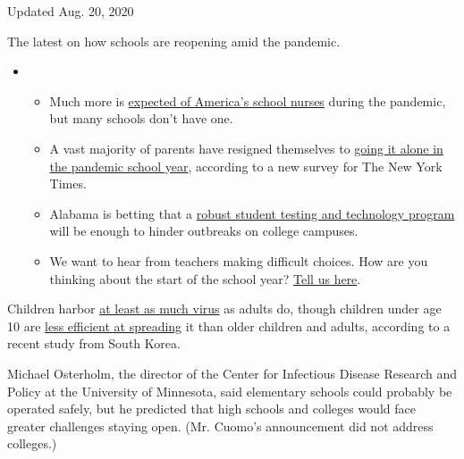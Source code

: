 Updated Aug. 20, 2020

The latest on how schools are reopening amid the pandemic.

\begin{itemize}
\item
  \begin{itemize}
  \tightlist
  \item
    Much more is
    \href{https://www.nytimes3xbfgragh.onion/2020/08/20/us/schools-reopening-nurses-covid.html?action=click\&pgtype=Article\&state=default\&region=MAIN_CONTENT_3\&context=storylines_keepup}{expected
    of America's school nurses} during the pandemic, but many schools
    don't have one.
  \item
    A vast majority of parents have resigned themselves to
    \href{https://www.nytimes3xbfgragh.onion/2020/08/19/us/colleges-closing-covid.html?action=click\&pgtype=Article\&state=default\&region=MAIN_CONTENT_3\&context=storylines_keepup}{going
    it alone in the pandemic school year}, according to a new survey for
    The New York Times.
  \item
    Alabama is betting that a
    \href{https://www.nytimes3xbfgragh.onion/2020/08/19/business/alabama-uab-coronavirus-tests.html?action=click\&pgtype=Article\&state=default\&region=MAIN_CONTENT_3\&context=storylines_keepup}{robust
    student testing and technology program} will be enough to hinder
    outbreaks on college campuses.
  \item
    We want to hear from teachers making difficult choices. How are you
    thinking about the start of the school year?
    \href{https://www.nytimes3xbfgragh.onion/2020/08/19/us/teachers-school-reopenings.html?action=click\&pgtype=Article\&state=default\&region=MAIN_CONTENT_3\&context=storylines_keepup}{Tell
    us here}.
  \end{itemize}
\end{itemize}

Children harbor
\href{https://www.nytimes3xbfgragh.onion/2020/07/30/health/coronavirus-children.html}{at
least as much virus} as adults do, though children under age 10 are
\href{https://www.nytimes3xbfgragh.onion/2020/07/18/health/coronavirus-children-schools.html}{less
efficient at spreading} it than older children and adults, according to
a recent study from South Korea.

Michael Osterholm, the director of the Center for Infectious Disease
Research and Policy at the University of Minnesota, said elementary
schools could probably be operated safely, but he predicted that high
schools and colleges would face greater challenges staying open. (Mr.
Cuomo's announcement did not address colleges.)

